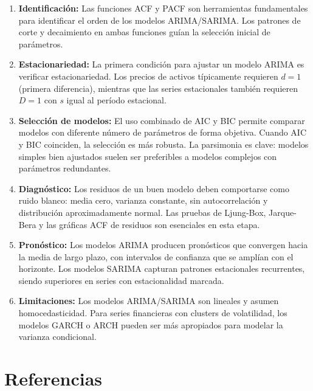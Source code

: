 \documentclass[12pt, a4paper]{article}
\begin{document}
\begin{enumerate}[leftmargin=*]
  \item \textbf{Identificación:} Las funciones ACF y PACF son herramientas
    fundamentales para identificar el orden de los modelos ARIMA/SARIMA.
    Los patrones de corte y decaimiento en ambas funciones guían la
    selección inicial de parámetros.

  \item \textbf{Estacionariedad:} La primera condición para ajustar un modelo
    ARIMA es verificar estacionariedad. Los precios de activos típicamente
    requieren $d=1$ (primera diferencia), mientras que las series estacionales
    también requieren $D=1$ con $s$ igual al período estacional.

  \item \textbf{Selección de modelos:} El uso combinado de AIC y BIC permite
    comparar modelos con diferente número de parámetros de forma objetiva.
    Cuando AIC y BIC coinciden, la selección es más robusta. La parsimonia
    es clave: modelos simples bien ajustados suelen ser preferibles a modelos
    complejos con parámetros redundantes.

  \item \textbf{Diagnóstico:} Los residuos de un buen modelo deben comportarse
    como ruido blanco: media cero, varianza constante, sin autocorrelación
    y distribución aproximadamente normal. Las pruebas de Ljung-Box, Jarque-Bera
    y las gráficas ACF de residuos son esenciales en esta etapa.

  \item \textbf{Pronóstico:} Los modelos ARIMA producen pronósticos que
    convergen hacia la media de largo plazo, con intervalos de confianza
    que se amplían con el horizonte. Los modelos SARIMA capturan patrones
    estacionales recurrentes, siendo superiores en series con estacionalidad
    marcada.

  \item \textbf{Limitaciones:} Los modelos ARIMA/SARIMA son lineales y
    asumen homocedasticidad. Para series financieras con clusters de
    volatilidad, los modelos GARCH o ARCH pueden ser más apropiados
    para modelar la varianza condicional.
\end{enumerate}

\section*{Referencias}
\end{document}
